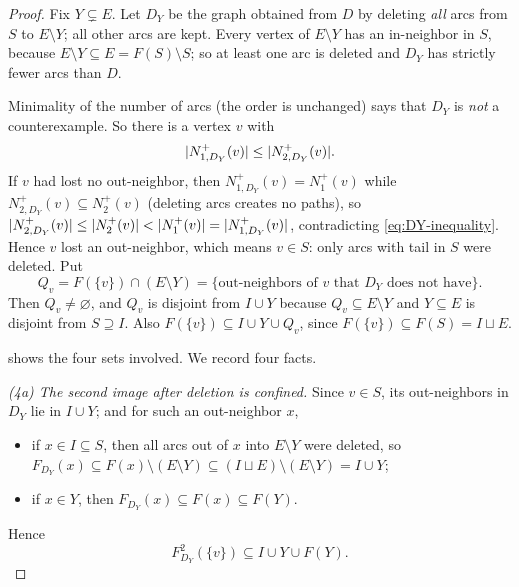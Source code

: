 \begin{proof}
Fix $Y\subsetneq E$. Let $D_Y$ be the graph obtained from $D$ by deleting \emph{all} arcs from $S$
to $E\setminus Y$; all other arcs are kept. Every vertex of $E\setminus Y$ has an in-neighbor in
$S$, because $E\setminus Y\subseteq E=F(S)\setminus S$; so at least one arc is deleted and $D_Y$
has strictly fewer arcs than $D$.

Minimality of the number of arcs (the order is unchanged) says that $D_Y$ is \emph{not} a
counterexample. So there is a vertex $v$ with
\begin{equation}\label{eq:DY-inequality}
 \lvert N_{1,D_Y}^+(v)\rvert\le\lvert N_{2,D_Y}^+(v)\rvert.
\end{equation}
If $v$ had lost no out-neighbor, then $N_{1,D_Y}^+(v)=N_1^+(v)$ while $N_{2,D_Y}^+(v)\subseteq
N_2^+(v)$ (deleting arcs creates no paths), so
$\lvert N_{2,D_Y}^+(v)\rvert\le\lvert N_2^+(v)\rvert<\lvert N_1^+(v)\rvert=\lvert N_{1,D_Y}^+(v)\rvert$, contradicting
\eqref{eq:DY-inequality}. Hence $v$ lost an out-neighbor, which means $v\in S$: only arcs with tail
in $S$ were deleted. Put
\begin{equation}\label{eq:Qv}
 Q_v=F(\{v\})\cap(E\setminus Y)=\{\text{out-neighbors of }v\text{ that }D_Y\text{ does not have}\}.
\end{equation}
Then $Q_v\ne\varnothing$, and $Q_v$ is disjoint from $I\cup Y$ because $Q_v\subseteq E\setminus Y$
and $Y\subseteq E$ is disjoint from $S\supseteq I$. Also $F(\{v\})\subseteq I\cup Y\cup Q_v$,
since $F(\{v\})\subseteq F(S)=I\sqcup E$.

 shows the four sets involved. We record four facts.

\emph{(4a) The second image after deletion is confined.} Since $v\in S$, its out-neighbors in
$D_Y$ lie in $I\cup Y$; and for such an out-neighbor $x$,
\begin{itemize}[leftmargin=1.4em,itemsep=1pt,topsep=1pt]
\item if $x\in I\subseteq S$, then all arcs out of $x$ into $E\setminus Y$ were deleted, so
  $F_{D_Y}(x)\subseteq F(x)\setminus(E\setminus Y)\subseteq (I\sqcup E)\setminus(E\setminus
  Y)=I\cup Y$;
\item if $x\in Y$, then $F_{D_Y}(x)\subseteq F(x)\subseteq F(Y)$.
\end{itemize}
Hence
\begin{equation}\label{eq:confined}
 F_{D_Y}^2(\{v\})\subseteq I\cup Y\cup F(Y).
\end{equation}


\end{proof}
